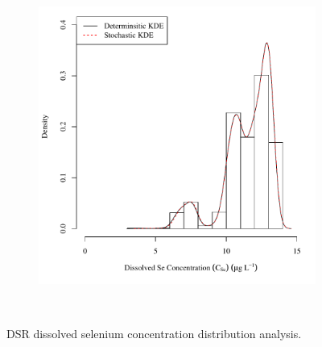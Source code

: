\begin{linenumbers}
\begin{landscape}
\begin{figure}
\begin{subfigure}{0.7\textwidth}
			\includegraphics[width=\tableCustomSize]{"Figures/Results_DSR/Stochastic/c d&s est BUF"}
		\end{subfigure}\\
		\caption{DSR dissolved selenium concentration distribution analysis.}
	\end{figure}
\end{landscape}


\end{linenumbers}
